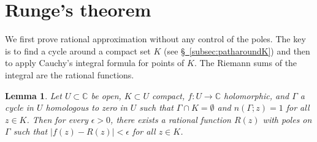 \documentclass[12pt,openany]{book}
\newcommand{\sabs}[1]{\lvert {#1} \rvert}
\newcommand{\C}{{\mathbb{C}}}
\theoremstyle{plain}
\newtheorem{lemma}[thm]{Lemma}
\theoremstyle{remark}
\theoremstyle{definition}
\theoremstyle{exercise}
\theoremstyle{example}
\newcommand{\subsectionref}[1]{\hyperref[#1]{\S~\ref*{#1}}}
\begin{document}

\section{Runge's theorem}
\label{sec:runge}

We first prove rational approximation without any control of the poles.
The key is to find a cycle around a compact set $K$
(see \subsectionref{subsec:patharoundK})
and then to apply Cauchy's integral formula for points of $K$.
The Riemann sums of the
integral are the rational functions.

\begin{lemma} \label{lemma:ratapproxriemann}
Let $U \subset \C$ be open, $K \subset U$ compact, $f \colon U \to \C$
holomorphic, and $\Gamma$ a cycle in $U$ homologous to zero in $U$
such that $\Gamma \cap K = \emptyset$ and $n(\Gamma;z) = 1$ for all $z \in
K$.  Then for every $\epsilon > 0$, there exists a rational function $R(z)$ with
poles on $\Gamma$ such that $\sabs{f(z)-R(z)} < \epsilon$ for all $z \in K$.
\end{lemma}
\end{document}
